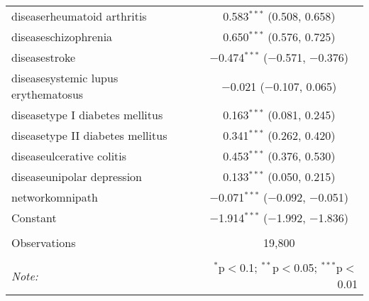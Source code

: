 \begin{table}[!htbp]
\begin{tabular}{@{\extracolsep{5pt}}lc}
  diseaserheumatoid arthritis & 0.583$^{***}$ (0.508, 0.658) \\ 
  diseaseschizophrenia & 0.650$^{***}$ (0.576, 0.725) \\ 
  diseasestroke & $-$0.474$^{***}$ ($-$0.571, $-$0.376) \\ 
  diseasesystemic lupus erythematosus & $-$0.021 ($-$0.107, 0.065) \\ 
  diseasetype I diabetes mellitus & 0.163$^{***}$ (0.081, 0.245) \\ 
  diseasetype II diabetes mellitus & 0.341$^{***}$ (0.262, 0.420) \\ 
  diseaseulcerative colitis & 0.453$^{***}$ (0.376, 0.530) \\ 
  diseaseunipolar depression & 0.133$^{***}$ (0.050, 0.215) \\ 
  networkomnipath & $-$0.071$^{***}$ ($-$0.092, $-$0.051) \\ 
  Constant & $-$1.914$^{***}$ ($-$1.992, $-$1.836) \\ 
 \hline \\[-1.8ex] 
Observations & 19,800 \\ 
\hline 
\hline \\[-1.8ex] 
\textit{Note:}  & \multicolumn{1}{r}{$^{*}$p$<$0.1; $^{**}$p$<$0.05; $^{***}$p$<$0.01} \\ 
\end{tabular} 
\end{table} 
